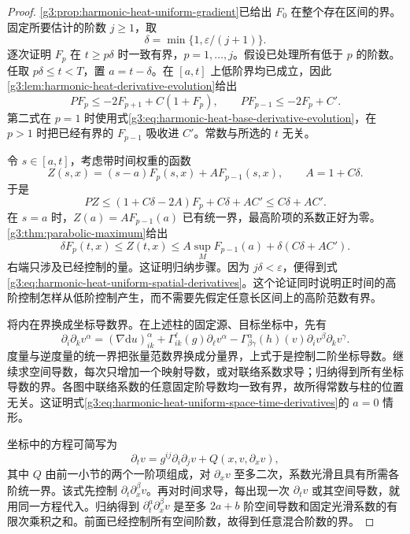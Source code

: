 \begin{proof}
	\cref{g3:prop:harmonic-heat-uniform-gradient}已给出 \(F_0\) 在整个存在区间的界。固定所要估计的阶数 \(j\ge1\)，取
	\[
		\delta=\min\{1,\varepsilon/(j+1)\}.
	\]
	逐次证明 \(F_p\) 在 \(t\ge p\delta\) 时一致有界，\(p=1,\ldots,j\)。假设已处理所有低于 \(p\) 的阶数。任取 \(p\delta\le t<T\)，置 \(a=t-\delta\)。在 \([a,t]\) 上低阶界均已成立，因此\cref{g3:lem:harmonic-heat-derivative-evolution}给出
	\[
		PF_p\le-2F_{p+1}+C(1+F_p),\qquad
		PF_{p-1}\le-2F_p+C'.
	\]
	第二式在 \(p=1\) 时使用式\eqref{g3:eq:harmonic-heat-base-derivative-evolution}，在 \(p>1\) 时把已经有界的 \(F_{p-1}\) 吸收进 \(C'\)。常数与所选的 \(t\) 无关。

	令 \(s\in[a,t]\)，考虑带时间权重的函数
	\[
		Z(s,x)=(s-a)F_p(s,x)+A F_{p-1}(s,x),
		\qquad A=1+C\delta.
	\]
	于是
	\[
		PZ\le(1+C\delta-2A)F_p+C\delta+AC'
		\le C\delta+AC'.
	\]
	在 \(s=a\) 时，\(Z(a)=AF_{p-1}(a)\) 已有统一界，最高阶项的系数正好为零。\cref{g3:thm:parabolic-maximum}给出
	\[
		\delta F_p(t,x)\le Z(t,x)
		\le A\sup_MF_{p-1}(a)+\delta(C\delta+AC').
	\]
	右端只涉及已经控制的量。这证明归纳步骤。因为 \(j\delta<\varepsilon\)，便得到式\eqref{g3:eq:harmonic-heat-uniform-spatial-derivatives}。这个论证同时说明正时间的高阶控制怎样从低阶控制产生，而不需要先假定任意长区间上的高阶范数有界。

	将内在界换成坐标导数界。在上述柱的固定源、目标坐标中，先有
	\[
		\partial_i\partial_kv^\alpha
		=(\nabla\mathrm du)_{ik}^\alpha
		+\Gamma^\ell_{ik}(g)\partial_\ell v^\alpha
		-\Gamma^\alpha_{\beta\gamma}(h)(v)
		\partial_iv^\beta\partial_kv^\gamma.
	\]
	度量与逆度量的统一界把张量范数界换成分量界，上式于是控制二阶坐标导数。继续求空间导数，每次只增加一个映射导数，或对联络系数求导；归纳得到所有坐标导数的界。各图中联络系数的任意固定阶导数均一致有界，故所得常数与柱的位置无关。这证明式\eqref{g3:eq:harmonic-heat-uniform-space-time-derivatives}的 \(a=0\) 情形。

	坐标中的方程可简写为
	\begin{equation}\label{g3:eq:harmonic-heat-coordinate-time-recursion}
		\partial_tv=g^{ij}\partial_i\partial_jv+Q(x,v,\partial_xv),
	\end{equation}
	其中 \(Q\) 由前一小节的两个一阶项组成，对 \(\partial_xv\) 至多二次，系数光滑且具有所需各阶统一界。该式先控制 \(\partial_t\partial_x^\beta v\)。再对时间求导，每出现一次 \(\partial_tv\) 或其空间导数，就用同一方程代入。归纳得到 \(\partial_t^a\partial_x^\beta v\) 是至多 \(2a+b\) 阶空间导数和固定光滑系数的有限次乘积之和。前面已经控制所有空间阶数，故得到任意混合阶数的界。
\end{proof}


